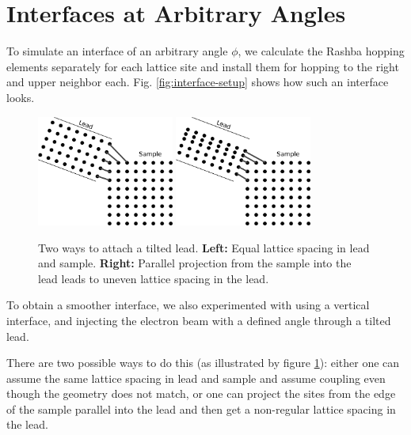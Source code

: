 \section{Interfaces at Arbitrary Angles}

To simulate an interface of an arbitrary angle $\phi$, we calculate the Rashba
hopping elements separately for each lattice site and install them for
hopping to the right and upper neighbor each. Fig. \ref{fig:interface-setup}
shows how such an interface looks.

\begin{figure}[htb]
    \begin{center}
        \includegraphics[width=0.4\textwidth]{lead-tilted-1.pdf}
        \hspace{0.1\textwidth}
        \includegraphics[width=0.4\textwidth]{lead-tilted-2.pdf}
    \end{center}
    \caption{Two ways to attach a tilted lead. \textbf{Left:} Equal lattice
        spacing in lead and sample. \textbf{Right:} Parallel projection from
        the sample into the lead leads to uneven lattice spacing in the lead.}
    \label{fig:tilted-leads}
\end{figure}

To obtain a smoother interface, we also experimented with using a vertical
interface, and injecting the electron beam with a defined angle through a tilted lead.

There are two possible
ways to do this (as illustrated by figure \ref{fig:tilted-leads}):
either one can assume the same lattice spacing in lead and sample and assume
coupling even though the geometry does not match, or one can project the sites
from the edge of the sample parallel into the lead and then get a non-regular
lattice spacing in the lead.

